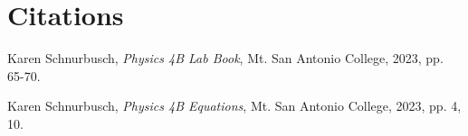 \documentclass[12pt]{iopart} %
\begin{document}
\section{Citations}

\begin{thebibliography}{9}

  Karen Schnurbusch,
  \textit{Physics 4B Lab Book},
  Mt. San Antonio College,
  2023,
  pp. 65-70.

  Karen Schnurbusch,
  \textit{Physics 4B Equations},
  Mt. San Antonio College,
  2023,
  pp. 4, 10.

\end{thebibliography}
\end{document}
